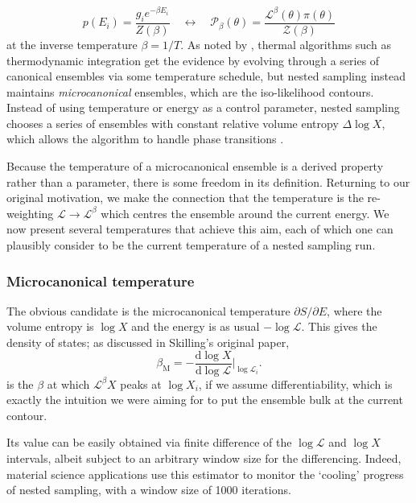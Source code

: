 \documentclass[usenatbib]{mnras}
\newcommand{\Like}{\mathcal{L}}
\begin{document}
\begin{equation}
    p(E_i) = \frac{g_i e^{-\beta E_i}}{Z(\beta)} \quad \leftrightarrow \quad \mathcal{P}_\beta(\theta) = \frac{\mathcal{L}^{\beta}(\theta)\pi(\theta)}{\mathcal{Z}(\beta)}
\end{equation}
at the inverse temperature $\beta = 1/T$. As noted by \citet{demons}, thermal algorithms such as thermodynamic integration \citep{path_sampling} get the evidence by evolving through a series of canonical ensembles via some temperature schedule, but nested sampling instead maintains \textit{microcanonical} ensembles, which are the iso-likelihood contours. Instead of using temperature \citep{simulated_annealing, parallel_tempering} or energy \citep{wang_landau} as a control parameter, nested sampling chooses a series of ensembles with constant relative volume entropy $\Delta \log X$, which allows the algorithm to handle phase transitions \citep{baldock}.
\par
Because the temperature of a microcanonical ensemble is a derived property rather than a parameter, there is some freedom in its definition. Returning to our original motivation, we make the connection that the temperature is the re-weighting $\Like \to \Like^{\beta}$ which centres the ensemble around the current energy. We now present several temperatures that achieve this aim, each of which one can plausibly consider to be the current temperature of a nested sampling run.

\subsubsection{Microcanonical temperature}\label{sec:microcanonical_temperature}
The obvious candidate is the microcanonical temperature $\partial S/\partial E$, where the volume entropy is $\log X$ and the energy is as usual $-\log \Like$. This gives the density of states; as discussed in Skilling's original paper,
\begin{equation}
    \beta_\mathrm{M}  = - \frac{\mathrm{d} \log X}{\mathrm{d} \log \Like} \Bigg\vert_{\log \Like_i}.
\end{equation}
is the $\beta$ at which $\Like^{\beta} X$ peaks at $\log X_i$, if we assume differentiability, which is exactly the intuition we were aiming for to put the ensemble bulk at the current contour. 
\par
Its value can be easily obtained via finite difference of the $\log \Like$ and $\log X$ intervals, albeit subject to an arbitrary window size for the differencing. Indeed, material science applications \citep{Baldock_2017} use this estimator to monitor the `cooling' progress of nested sampling, with a window size of 1000 iterations.
\end{document}
